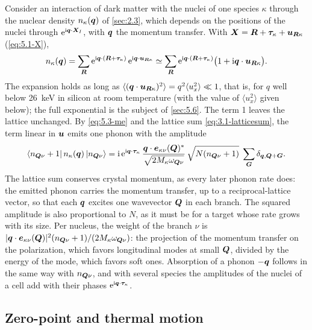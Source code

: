 Consider an interaction of dark matter with the nuclei of one species $\kappa$ through the nuclear density $n_\kappa(\bm{q})$ of \cref{sec:2.3}, which depends on the positions of the nuclei through $\mathrm{e}^{\mathrm{i}\bm{q}\cdot\bm{X}_I}$, with $\bm{q}$ the momentum transfer. With $\bm{X} = \bm{R} + \bm{\tau}_\kappa + \bm{u}_{\bm{R}\kappa}$ (\cref{eq:5.1-X}),
\begin{equation*}
  n_\kappa(\bm{q}) = \sum_{\bm{R}}\mathrm{e}^{\mathrm{i}\bm{q}\cdot(\bm{R} + \bm{\tau}_\kappa)}\,\mathrm{e}^{\mathrm{i}\bm{q}\cdot\bm{u}_{\bm{R}\kappa}}
  \simeq \sum_{\bm{R}}\mathrm{e}^{\mathrm{i}\bm{q}\cdot(\bm{R} + \bm{\tau}_\kappa)}\bigl(1 + \mathrm{i}\bm{q}\cdot\bm{u}_{\bm{R}\kappa}\bigr) .
\end{equation*}
The expansion holds as long as $\langle(\bm{q}\cdot\bm{u}_{\bm{R}\kappa})^2\rangle = q^2\langle u_x^2\rangle \ll 1$, that is, for $q$ well below \SI{26}{keV} in silicon at room temperature (with the value of $\langle u_x^2\rangle$ given below); the full exponential is the subject of \cref{sec:5.6}. The term 1 leaves the lattice unchanged. By \cref{eq:5.3-me} and the lattice sum \cref{eq:3.1-latticesum}, the term linear in $\bm{u}$ emits one phonon with the amplitude
\begin{equation*}
  \langle n_{\bm{Q}\nu} + 1|\,n_\kappa(\bm{q})\,|n_{\bm{Q}\nu}\rangle
  = \mathrm{i}\,\mathrm{e}^{\mathrm{i}\bm{q}\cdot\bm{\tau}_\kappa}\,\frac{\bm{q}\cdot\bm{e}_{\kappa\nu}(\bm{Q})^*}{\sqrt{2M_\kappa\omega_{\bm{Q}\nu}}}\,\sqrt{N(n_{\bm{Q}\nu} + 1)}\;\sum_{\bm{G}}\delta_{\bm{q},\bm{Q} + \bm{G}} .
\end{equation*}
The lattice sum conserves crystal momentum, as every later phonon rate does: the emitted phonon carries the momentum transfer, up to a reciprocal-lattice vector, so that each $\bm{q}$ excites one wavevector $\bm{Q}$ in each branch. The squared amplitude is also proportional to $N$, as it must be for a target whose rate grows with its size. Per nucleus, the weight of the branch $\nu$ is $|\bm{q}\cdot\bm{e}_{\kappa\nu}(\bm{Q})|^2(n_{\bm{Q}\nu} + 1)/(2M_\kappa\omega_{\bm{Q}\nu})$: the projection of the momentum transfer on the polarization, which favors longitudinal modes at small $\bm{Q}$, divided by the energy of the mode, which favors soft ones. Absorption of a phonon $-\bm{q}$ follows in the same way with $n_{\bm{Q}\nu}$, and with several species the amplitudes of the nuclei of a cell add with their phases $\mathrm{e}^{\mathrm{i}\bm{q}\cdot\bm{\tau}_\kappa}$.

\subsection{Zero-point and thermal motion}

